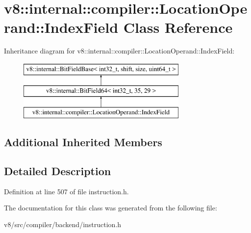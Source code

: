 \hypertarget{classv8_1_1internal_1_1compiler_1_1LocationOperand_1_1IndexField}{}\section{v8\+:\+:internal\+:\+:compiler\+:\+:Location\+Operand\+:\+:Index\+Field Class Reference}
\label{classv8_1_1internal_1_1compiler_1_1LocationOperand_1_1IndexField}
Inheritance diagram for v8\+:\+:internal\+:\+:compiler\+:\+:Location\+Operand\+:\+:Index\+Field\+:\begin{figure}[H]
\begin{center}
\leavevmode
\includegraphics[height=3.000000cm]{classv8_1_1internal_1_1compiler_1_1LocationOperand_1_1IndexField}
\end{center}
\end{figure}
\subsection*{Additional Inherited Members}


\subsection{Detailed Description}


Definition at line 507 of file instruction.\+h.



The documentation for this class was generated from the following file\+:\begin{DoxyCompactItemize}
\item 
v8/src/compiler/backend/instruction.\+h\end{DoxyCompactItemize}
